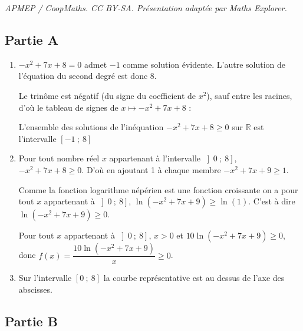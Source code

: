 \documentclass[10pt]{article}
\providecommand{\R}{\mathbb{R}}
\begin{document}
\noindent\textit{APMEP / CoopMaths. CC BY-SA. Présentation adaptée par Maths Explorer.}\par\medskip
\subsection*{Partie A}

\begin{enumerate}
	\item $-x^2 + 7x + 8 =0$ admet $-1$ comme solution évidente. L'autre solution de l'équation du second degré est donc $8$.

Le trinôme est négatif (du signe du coefficient de $x^2$), sauf entre les racines, d'où le tableau de signes  de $x\longmapsto -x^2 + 7x + 8 $ :
	
	
L'ensemble des solutions de l'inéquation 	$-x^2 + 7x + 8 \geqslant 0$ sur $\R$ est l'intervalle $\left[-1~;~8\right]$
	
	\item Pour tout nombre réel $x$ appartenant à l'intervalle $\left]0~;~8\right]$, $-x^2 + 7x + 8 \geqslant 0$. D'où en ajoutant 1 à chaque membre $-x^2 + 7x + 9 \geqslant 1$.

	Comme la fonction logarithme népérien est une fonction croissante on a pour tout  $x$ appartenant à $\left]0~;~8\right]$, $\ln\left(- x^2 + 7x + 9\right) \geqslant \ln(1)$. C'est à dire $\ln\left(- x^2 + 7x + 9\right) \geqslant 0$.

Pour tout $x$ appartenant à $\left]0~;~8\right]$, $x>0$ et  $10\ln\left(-x^2 + 7x + 9\right) \geqslant 0$, donc $f(x) = \dfrac{10\ln\left(-x^2 + 7x + 9\right)}{x} \geqslant 0$.

	\item Sur l'intervalle $[0~;~8]$ la courbe représentative est au dessus de l'axe des abscisses.
	
\end{enumerate}

\subsection*{Partie B}
\end{document}
